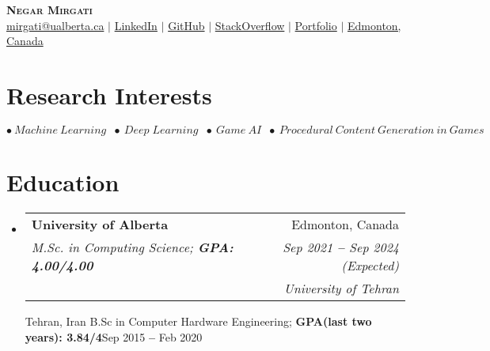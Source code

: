 \documentclass[letterpaper,11pt]{article}
\makeatletter
\newcommand{\resumeSubheading}[4]{
  \vspace{-2pt}\item
    \begin{tabular*}{0.97\textwidth}[t]{l@{\extracolsep{\fill}}r}
      \textbf{#1} & #2 \\
      \textit{\small#3} & \textit{\small #4} \\
    \end{tabular*}\vspace{-7pt}
}
\newcommand{\resumeEducationHeading}[6]{
  \vspace{-2pt}\item
    \begin{tabular*}{0.97\textwidth}[t]{l@{\extracolsep{\fill}}r}
      \textbf{#1} & #2 \\
      \textit{\small#3} & \textit{\small #4} \\
      \textit{\small#5} & \textit{\small #6} \\
    \end{tabular*}\vspace{-5pt}
}
\newcommand{\resumeSubHeadingListStart}{\begin{itemize}[leftmargin=0.15in, label={}]}
\newcommand{\resumeSubHeadingListEnd}{\end{itemize}}
\makeatother
\begin{document}

\begin{center}
    \textbf{\Huge \scshape Negar Mirgati} \\ \vspace{3pt}
    \small
    \faAt \hspace{.5pt} \href{mailto:mirgati@ualberta.ca}{mirgati@ualberta.ca}
    $|$
    \faLinkedinSquare \hspace{.5pt} \href{https://www.linkedin.com/in/negar-mirgati-4a84a2108/}{LinkedIn}
    $|$
    \faGithub \hspace{.5pt} \href{https://github.com/negarmirgati}{GitHub}
    $|$
    \faStackOverflow \hspace{.5pt} \href{https://stackoverflow.com/users/6287044/winston}{StackOverflow}
    $|$
    \faGlobe \hspace{.5pt} \href{https://negarmirgati.github.io}{Portfolio}
    $|$
    \faMapMarker \hspace{.5pt} \href{https://goo.gl/maps/FE5WmENspj7VT9YU9}{Edmonton, Canada}
\end{center}



\section{Research Interests}
  \vspace{3pt}
  
$\bullet \: Machine \: Learning \; \; \bullet \: Deep \; Learning \; \; \bullet \: Game \: AI \;\; \bullet \: Procedural \: Content \: Generation \: in \: Games $




\section{Education}
  \vspace{3pt}
  \resumeSubHeadingListStart
    
    \resumeEducationHeading
      {University of Alberta
      }{Edmonton, Canada}
      {M.Sc. in Computing Science;   \textbf{GPA: 4.00/4.00}}{Sep 2021 \textbf{--} Sep 2024 (Expected)}

    
    \resumeSubheading
      {University of Tehran
      }{Tehran, Iran}
      {B.Sc in Computer Hardware Engineering;   \textbf{GPA(last two years): 3.84/4}}{Sep 2015 \textbf{--} Feb 2020}
  \resumeSubHeadingListEnd
\end{document}
